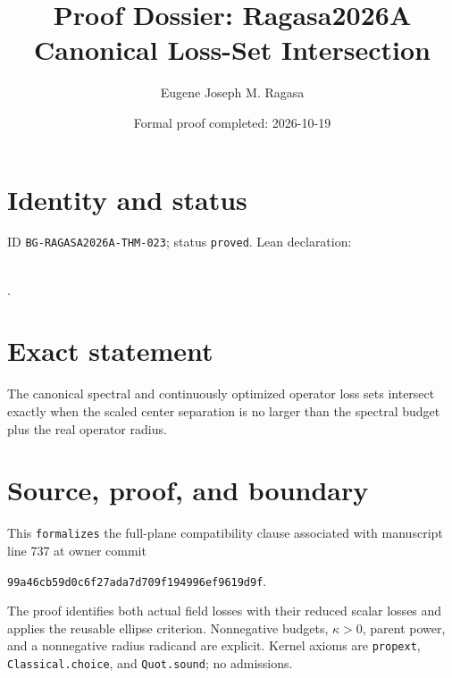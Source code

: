 \documentclass[11pt]{article}
\title{Proof Dossier: Ragasa2026A Canonical Loss-Set Intersection}\author{Eugene Joseph M. Ragasa}\date{Formal proof completed: 2026-10-19}
\begin{document}
\maketitle
\section{Identity and status}
ID \texttt{BG-RAGASA2026A-THM-023}; status \texttt{proved}. Lean declaration:
\par{}\\
{\tiny{}}.
\section{Exact statement}
The canonical spectral and continuously optimized operator loss sets intersect exactly
when the scaled center separation is no larger than the spectral budget plus the real
operator radius.
\section{Source, proof, and boundary}
This \texttt{formalizes} the full-plane compatibility clause associated with manuscript
line 737 at owner commit
\begin{center}\small\texttt{99a46cb59d0c6f27ada7d709f194996ef9619d9f}.\end{center}
The proof identifies both actual field losses with their reduced scalar losses and applies
the reusable ellipse criterion. Nonnegative budgets, $\kappa>0$, parent power, and a
nonnegative radius radicand are explicit. Kernel axioms are \texttt{propext},
\texttt{Classical.choice}, and \texttt{Quot.sound}; no admissions.
\end{document}
